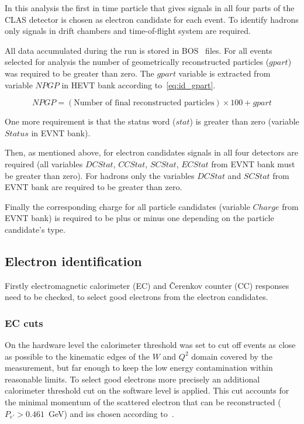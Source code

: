 In this analysis the first in time particle that gives signals in all four parts of the CLAS detector is chosen as electron candidate for each event. To identify hadrons only signals in drift chambers and time-of-flight system are required.

All data accumulated during the run is stored in BOS~\cite{BOS:bank} files. For all events selected for analysis the number of geometrically reconstructed particles ($gpart$) was required to be greater than zero. The $gpart$ variable is extracted from variable $NPGP$ in HEVT bank according to~\ref{eq:id_gpart}. 

\begin{equation}
NPGP=(\text{Number of final reconstructed particles})\times100 + gpart
\label{eq:id_gpart}
\end{equation}

One more requirement is that the status word ($stat$) is greater than zero (variable $Status$ in EVNT bank).

Then, as mentioned above, for electron candidates signals in all four detectors are required (all variables $DCStat$, $CCStat$, $SCStat$, $ECStat$ from EVNT bank must be greater than zero). For hadrons only the variables $DCStat$ and $SCStat$ from EVNT bank are required to be greater than zero. 

Finally the corresponding charge for all particle candidates (variable $Charge$ from EVNT bank) is required to be plus or minus one depending on the particle candidate's type.
 

\subsection{Electron identification}
\label{electron} 

Firstly electromagnetic calorimeter (EC) and \v Cerenkov counter (CC) responses need to be checked, to select good electrons from the electron candidates.

\subsubsection{EC cuts}
\label{ec_cuts}


On the hardware level the calorimeter threshold was set
to cut off events as close as possible to the kinematic edges
of the $W$ and $Q^{2}$ domain covered by the measurement, but far
enough to keep the low energy contamination within reasonable
limits. To select good electrons more precisely an additional calorimeter threshold cut on the software level  is applied. This cut accounts for the minimal momentum of the scattered electron that can be reconstructed ($P_{e'} > 0.461$~GeV) and iss chosen according to~\cite{Egian:007}.


